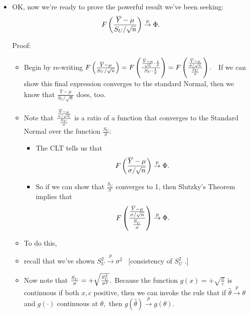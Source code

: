 \documentclass[11pt]{article}
\begin{document}
\begin{itemize}
\item OK, now we're ready to prove the powerful result we've been seeking:%
\begin{equation*}
F\left( \frac{\overline{Y}-\mu }{S_{U}/\sqrt{n}}\right) \overset{p}{%
\rightarrow }\Phi .
\end{equation*}

Proof:

\begin{itemize}
\item Begin by re-writing $F\left( \frac{\overline{Y}-\mu }{S_{U}/\sqrt{n}}%
\right) =F\left( \frac{\frac{\overline{Y}-\mu }{\sqrt{n}}\cdot \frac{1}{%
\sigma }}{S_{U}\cdot \frac{1}{\sigma }}\right) =F\left( \frac{\frac{%
\overline{Y}-\mu }{\sigma /\sqrt{n}}}{\frac{S_{U}}{\sigma }}\right) .$ \ If
we can show this final expression converges to the standard Normal, then we
know that $\frac{\overline{Y}-\mu }{S_{U}/\sqrt{n}}$ does, too.

\item Note that $\frac{\frac{\overline{Y}-\mu }{\sigma /\sqrt{n}}}{\frac{%
S_{U}}{\sigma }}$ is a ratio of a function that converges to the Standard
Normal over the function $\frac{S_{U}}{\sigma }$:

\begin{itemize}
\item The CLT tells us that 
\begin{equation*}
F\left( \frac{\overline{Y}-\mu }{\sigma /\sqrt{n}}\right) \overset{p}{%
\rightarrow }\Phi .
\end{equation*}

\item So if we can show that $\frac{S_{U}}{\sigma }$ converges to 1, then
Slutzky's Theorem implies that 
\begin{equation*}
F\left( \frac{\frac{\overline{Y}-\mu }{\sigma /\sqrt{n}}}{\frac{S_{U}^{{}}}{%
\sigma }}\right) \overset{p}{\rightarrow }\Phi .
\end{equation*}
\end{itemize}

\item To do this,

\item recall that we've shown $S_{U}^{2}\overset{p}{\rightarrow }\sigma ^{2}$
\ [consistency of $S_{U}^{2}$ .]

\item Now note that $\frac{S_{U}^{{}}}{\sigma }=+\sqrt{\frac{S_{U}^{2}}{%
\sigma ^{2}}}.$ Because the function $g(x)=+\sqrt{\frac{x}{c}}$ is
continuous if both $x,c$ positive, then we can invoke the rule that if $%
\widehat{\theta }\overset{p}{\rightarrow }\theta $ and $g(\cdot )$
continuous at $\theta ,$ then $g(\widehat{\theta })\overset{p}{\rightarrow }%
g(\theta ).$


\end{itemize}
\end{itemize}
\end{document}
